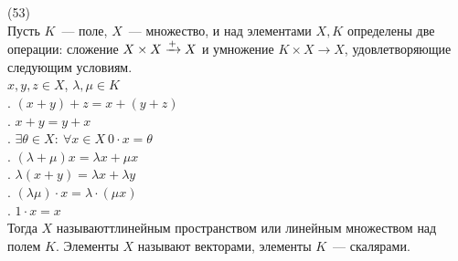 (53)\\
Пусть $K$~--- поле, $X$~--- множество, и над элементами $X, K$ определены две операции: сложение $X \times X \xrightarrow[]{+} X$ и умножение $K \times X \to X$, удовлетворяющие следующим условиям.
\\ $x, y, z \in X$, $\lambda, \mu \in K$\\
. $(x + y) + z = x + (y + z)$\\
. $x + y = y + x$\\
. $\exists \theta \in X:\ \forall x \in X\ 0\cdot x = \theta$\\
. $(\lambda + \mu)x = \lambda x + \mu x$\\
. $\lambda(x + y) = \lambda x + \lambda y$\\
. $(\lambda\mu)\cdot x= \lambda \cdot (\mu x)$\\
. $1 \cdot x = x$\\
Тогда $X$ называюттлинейным пространством или линейным множеством над полем $K$. Элементы $X$ называют векторами, элементы $K$~--- скалярами.